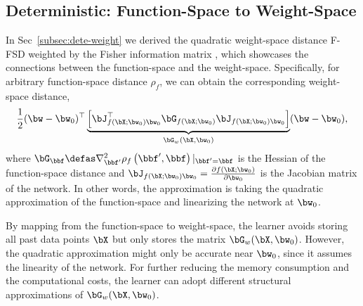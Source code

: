 \subsection{Deterministic: Function-Space to Weight-Space}
In Sec~\ref{subsec:dete-weight} we derived the quadratic weight-space distance F-FSD weighted by the Fisher information matrix , which showcases the connections between the function-space and the weight-space. Specifically, for arbitrary function-space distance $\rho_f$, we can obtain the corresponding weight-space distance,
\begin{align}
    \frac{1}{2} (\bw - \bw_0)^{\top} \underbrace{\left[\bJ_{f(\bX; \bw_0) \bw_0}^{\top} \bG_{f(\bX; \bw_0)} \bJ_{f(\bX; \bw_0) \bw_0}\right]}_{\bG_w(\bX, \bw_0)} (\bw - \bw_0),
\end{align}
where $\bG_\bbf \defas \nabla_{\bbf'}^2 \rho_f\left(\bbf', \bbf  \right) |_{\bbf'=\bbf}$ is the Hessian of the function-space distance and $\bJ_{f(\bX; \bw_0) \bw_0} = \frac{\partial f(\bX; \bw_0) }{\partial \bw_0}$ is the Jacobian matrix of the network. In other words, the approximation is taking the quadratic approximation of the function-space and linearizing the network at $\bw_0$. 

By mapping from the function-space to weight-space, the learner avoids storing all past data points $\bX$ but only stores the matrix $\bG_w(\bX, \bw_0)$. However, the quadratic approximation might only be accurate near $\bw_0$, since it assumes the linearity of the network.
For further reducing the memory consumption and the computational costs, the learner can adopt different structural approximations of $\bG_w(\bX, \bw_0)$. 

